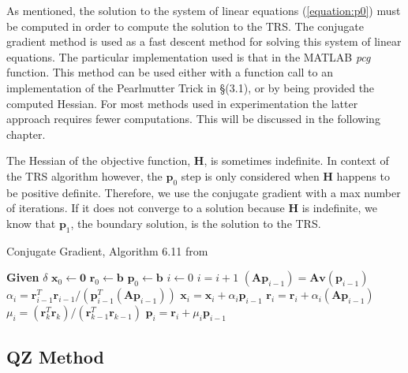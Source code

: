 \documentclass[letterpaper,12pt,titlepage,oneside,final]{book}
\begin{document}
	As mentioned, the solution to the system of linear equations (\ref{equation:p0}) must be computed in order to compute the solution to the TRS. The conjugate gradient method is used as a fast descent method for solving this system of linear equations. The particular implementation used is that in the MATLAB \textit{pcg} function. This method can be used either with a function call to an implementation of the Pearlmutter Trick in \S(3.1), or by being provided the computed Hessian. For most methods used in experimentation the latter approach requires fewer computations. This will be discussed in the following chapter.
	
	 The Hessian of the objective function, \textbf{H}, is sometimes indefinite. In context of the TRS algorithm however, the $\mathbf{p}_{0}$ step is only considered when \textbf{H} happens to be positive definite. Therefore, we use the conjugate gradient with a max number of iterations. If it does not converge to a solution because $\mathbf{H}$ is indefinite, we know that $\mathbf{p}_{1}$, the boundary solution, is the solution to the TRS.  
	 
	 \begin{algorithm}
	 	\caption{Conjugate Gradient, Algorithm 6.11 from \cite{demmel.book}}\label{algorithm:cg}
	 	\begin{algorithmic}[1]
	 		\State \textbf{Given} $\delta$ 
	 		\State $\mathbf{x}_{0} \gets \mathbf{0}$
	 		\State $\mathbf{r}_{0} \gets \mathbf{b}$
	 		\State $\mathbf{p}_{0} \gets \mathbf{b}$ 
	 		\State $i \gets 0$
	 		\State $i = i + 1$
	 		\State $(\mathbf{A}\mathbf{p}_{i-1}) = \mathbf{Av}(\mathbf{p}_{i-1})$
	 		\State $\alpha_{i} = \mathbf{r}^{T}_{i-1}\mathbf{r}_{i-1}/(\mathbf{p}^{T}_{i-1}(\mathbf{A}\mathbf{p}_{i-1}))$
	 		\State $\mathbf{x}_{i} = \mathbf{x}_{i} + \alpha_{i}\mathbf{p}_{i-1}$
	 		\State $\mathbf{r}_{i} = \mathbf{r}_{i} + \alpha_{i}(\mathbf{A}\mathbf{p}_{i-1})$ 
	 		\State $\mu_{i} = (\mathbf{r}^{T}_{k}\mathbf{r}_{k})/(\mathbf{r}_{k-1}^{T}\mathbf{r}_{k-1})$ 
	 		\State $\mathbf{p}_{i} = \mathbf{r}_{i} + \mu_{i}\mathbf{p}_{i-1}$
	 		\EndWhile 
	 		\EndProcedure
	 		\label{algorithm:cg}
	 	\end{algorithmic}
	 \end{algorithm}
		
	\subsection{QZ Method}
	
\end{document}
